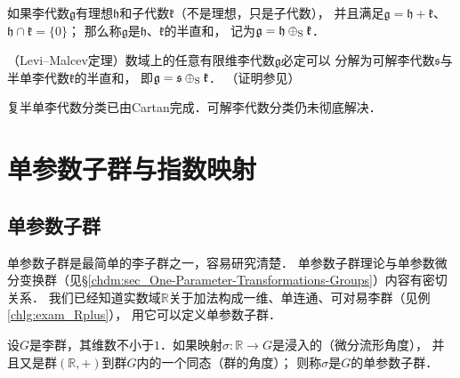 \begin{definition}
    如果李代数$\mathfrak{g}$有理想$\mathfrak{h}$和子代数$\mathfrak{k}$（不是理想，只是子代数），
    并且满足$\mathfrak{g}=\mathfrak{h}+\mathfrak{k}$、$\mathfrak{h}\cap\mathfrak{k}=\{0\}$；
    那么称$\mathfrak{g}$是$\mathfrak{h}$、$\mathfrak{k}$的{\heiti 半直和}，
    记为$\mathfrak{g}=\mathfrak{h}\oplus_{\rm S}\mathfrak{k}$．
\end{definition}



\begin{theorem}\label{chlg:thm_Levi-Malcev}
    （Levi--Malcev定理）数域上的任意有限维李代数$\mathfrak{g}$必定可以
    分解为可解李代数$\mathfrak{s}$与半单李代数$\mathfrak{k}$的半直和，
    即$\mathfrak{g}=\mathfrak{s}\oplus_{\rm S}\mathfrak{k}$．
    （证明参见\parencite[\S 5.6]{Hilgert-2012}）
\end{theorem}

复半单李代数分类已由Cartan完成．可解李代数分类仍未彻底解决．








\section{单参数子群与指数映射}
\subsection{单参数子群}\label{chlg:sec_1psg}
单参数子群是最简单的李子群之一，容易研究清楚．
单参数子群理论与单参数微分变换群（见\S\ref{chdm:sec_One-Parameter-Transformations-Groups}）内容有密切关系．
我们已经知道实数域$\mathbb{R}$关于加法构成一维、单连通、可对易李群（见例\ref{chlg:exam_Rplus}），
用它可以定义单参数子群．
\begin{definition}
    设$G$是李群，其维数不小于$1$．如果映射$\sigma:\mathbb{R}\to G$是浸入的（微分流形角度），
    并且又是群$(\mathbb{R},+)$到群$G$内的一个同态（群的角度）；
    则称$\sigma$是$G$的{\heiti 单参数子群}．
\end{definition}


